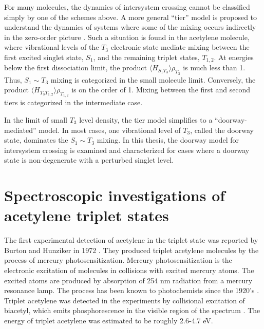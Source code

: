For many molecules, the dynamics of intersystem crossing cannot be
classified simply by one of the schemes above.  A more general
``tier'' model is proposed to understand the dynamics of systems where
some of the mixing occurs indirectly in the zero-order picture
\cite{stuchebrukhov93a, stuchebrukhov93b}.  Such a situation is found
in the acetylene molecule, where vibrational levels of the $T_3$
electronic state mediate mixing between the first excited singlet
state, $S_1$, and the remaining triplet states, $T_{1,2}$.  At
energies below the first dissociation limit, the product $\langle
H_{S_1 T_3} \rangle \rho_{T_3}$ is much less than 1.  Thus, $S_1 \sim
T_3$ mixing is categorized in the small molecule limit.  Conversely,
the product $\langle H_{T_3 T_{1,2}} \rangle \rho_{T_{1,2}}$ is on the
order of 1.  Mixing between the first and second tiers is categorized
in the intermediate case.

In the limit of small $T_3$ level density, the tier model simplifies
to a ``doorway-mediated'' model.  In most cases, one vibrational level
of $T_3$, called the doorway state, dominates the $S_1 \sim T_3$
mixing.  In this thesis, the doorway model for intersystem crossing is
examined and characterized for cases where a doorway state is
non-degenerate with a perturbed singlet level.

\section{Spectroscopic investigations of acetylene triplet states}

The first experimental detection of acetylene in the triplet state was
reported by Burton and Hunziker in 1972 \cite{burton72}.  They
produced triplet acetylene molecules by the process of mercury
photosensitization.  Mercury photosensitization is the electronic
excitation of molecules in collisions with excited mercury atoms.  The
excited atoms are produced by absorption of 254 nm radiation from a
mercury resonance lamp.  The process has been known to photochemists
since the 1920's \cite{calvert66, cairo22}.  Triplet acetylene was
detected in the experiments by collisional excitation of biacetyl,
which emits phosphorescence in the visible region of the spectrum
\cite{burton72}.  The energy of triplet acetylene was estimated to be
roughly 2.6-4.7 eV.


